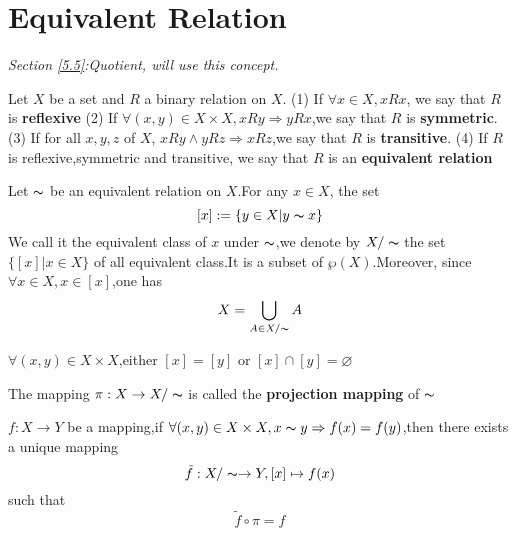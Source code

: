 \documentclass{book}
\numberwithin{equation}{section}
\begin{document}
\section{Equivalent Relation}\label{4.2}
\textit{Section \ref{5.5}:Quotient, will use this concept.}
\begin{definitionenv}
    Let $X$ be a set and $R$ a binary relation on $X$.
    \newline
    (1) If $\forall x \in X ,xRx$, we say that $R$ is \textbf{reflexive}
    \newline
    (2) If $\forall (x,y) \in X\times X,xRy\Rightarrow yRx$,we say that $R$ is \textbf{symmetric}.
    \newline
    (3) If for all $x,y,z$ of $X$, $xRy\wedge yRz\Rightarrow xRz$,we say that $R$ is \textbf{transitive}.
    \newline
    (4) If $R$ is reflexive,symmetric and transitive, we say that $R$ is an \textbf{equivalent relation}

\end{definitionenv}
\begin{definitionenv}
    Let $\thicksim$ be an equivalent relation on $X$.For any $x\in X$, the set $$[x]:=\{y\in X|y\thicksim x\}$$ We call it the equivalent class of $x$ under $\thicksim$,we denote by $X/\thicksim$ the set $\{[x]|x\in X\}$ of all equivalent class.It is a subset of $\wp (X)$.Moreover, since $\forall x\in X,x\in [x] $,one has $$X=\bigcup_{A\in X/\thicksim}A $$
\end{definitionenv}
\begin{propositionenv}
    $\forall (x,y)\in X\times X$,either $[x]=[y]$ or $[x]\cap [y]=\varnothing$
\end{propositionenv}
\begin{definitionenv}
    The mapping $\pi :X\rightarrow X/\thicksim$ is called the \textbf{projection mapping} of $\thicksim$
\end{definitionenv}
\begin{propositionenv}\label{4.2.5}
    $f:X\rightarrow Y$ be a mapping,if $\forall (x,y)\in X\times X,x\thicksim y\Rightarrow f(x)=f(y)$,then there exists a unique mapping$$\tilde{f}:X/\thicksim\rightarrow Y, [x]\mapsto f(x)$$such that $$\tilde{f}\circ \pi =f$$


\begin{center}
\end{center}
\end{propositionenv}
\end{document}
